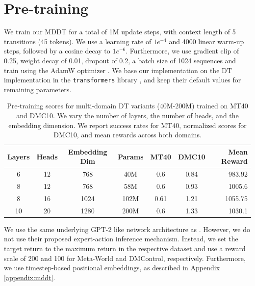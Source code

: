 \section{Pre-training}\label{appendix:pre-training}
We train our MDDT for a total of 1M update steps, with context length of 5 transitions (45 tokens). We use a learning rate of $1e^{-4}$ and 4000 linear warm-up steps, followed by a cosine decay to $1e^{-6}$. Furthermore, we use gradient clip of 0.25, weight decay of 0.01, dropout of 0.2, a batch size of 1024 sequences and train using the AdamW optimizer \citep{Loshchilov:18}. We base our implementation on the DT implementation in the \texttt{transformers} library \citep{Wolf:20}, and keep their default values for remaining parameters.

\begin{table}[]
    \centering
    \caption{Pre-training scores for multi-domain DT variants (40M-200M) trained on MT40 and DMC10. We vary the number of layers, the number of heads, and the embedding dimension. We report success rates for MT40, normalized scores for DMC10, and mean rewards across both domains.}
    \begin{tabular}{c c c c c  c r}
    \toprule
     \textbf{Layers} &  \textbf{Heads} &  \textbf{Embedding Dim} & \textbf{Params} & \textbf{MT40} & \textbf{DMC10} & \textbf{Mean Reward} \\
    \midrule
      6 &     12 &            768 &  40M  &   0.6 &   0.84 &  983.92 \\
      8 &     12 &            768 &  58M   &    0.6 &   0.93  &  1005.6  \\
      8 &     16 &           1024 &  102M   &   0.61 &   1.21  & 1055.75 \\
      10 &     20 &           1280 &  200M   &   0.6 &   1.33  &  1030.1\\
    \bottomrule
    \end{tabular}
    \label{tab:appendix-pretrain}
\end{table}

We use the same underlying GPT-2 like network architecture as \citet{Lee:22}. However, we do not use their proposed expert-action inference mechanism. Instead, we set the target return to the maximum return in the respective dataset and use a reward scale of 200 and 100 for Meta-World and DMControl, respectively. Furthermore, we use timestep-based positional embeddings, as described in Appendix \ref{appendix:mddt}.

